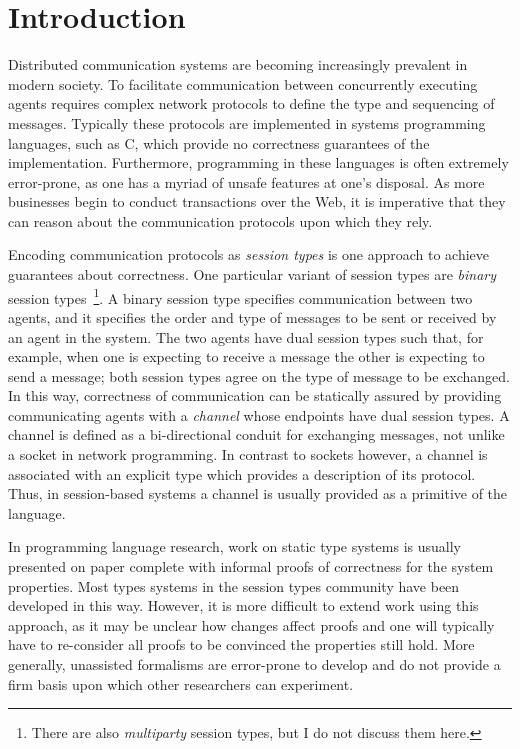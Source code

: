 \section{Introduction}\label{sec:intro}

Distributed communication systems are becoming increasingly prevalent in
modern society. To facilitate communication between concurrently executing
agents requires complex network protocols to define the type and sequencing of
messages. Typically these protocols are implemented in systems programming
languages, such as C, which provide no correctness guarantees of the
implementation. Furthermore, programming in these languages is often extremely
error-prone, as one has a myriad of unsafe features at one's disposal. As more
businesses begin to conduct transactions over the Web, it is imperative that
they can reason about the communication protocols upon which they rely.

Encoding communication protocols as \textit{session types} is one approach to
achieve guarantees about correctness. One particular variant of session types
are \textit{binary} session types~\footnote{There are also \textit{multiparty}
 session types, but I do not discuss them here.}. A binary session type
specifies communication between two agents, and it specifies the order and
type of messages to be sent or received by an agent in the system. The two
agents have dual session types such that, for example, when one is expecting
to receive a message the other is expecting to send a message; both session
types agree on the type of message to be exchanged. In this way, correctness
of communication can be statically assured by providing communicating agents
with a \textit{channel} whose endpoints have dual session types. A channel is
defined as a bi-directional conduit for exchanging messages, not unlike a
socket in network programming. In contrast to sockets however, a channel is
associated with an explicit type which provides a description of its
protocol. Thus, in session-based systems a channel is usually provided as a
primitive of the language.

In programming language research, work on static type systems is usually
presented on paper complete with informal proofs of correctness for the system
properties. Most types systems in the session types community have been
developed in this way. However, it is more difficult to extend work using this
approach, as it may be unclear how changes affect proofs and one will
typically have to re-consider all proofs to be convinced the properties still
hold. More generally, unassisted formalisms are error-prone to develop and do
not provide a firm basis upon which other researchers can experiment.

